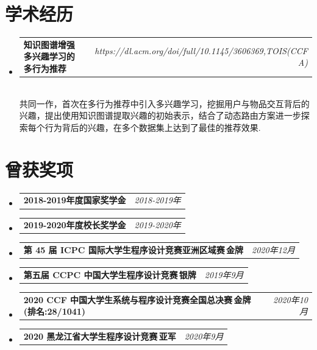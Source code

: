\documentclass[letterpaper,11pt]{article}
\makeatletter
\newcommand{\resumeItem}[2]{
  \item\small{
    \textbf{#1}{ #2 \vspace{-2pt}}
  }
}
\newcommand{\resumeSubheadingtwo}[2]{
  \vspace{-1pt}\item
    \begin{tabular*}{0.97\textwidth}{l@{\extracolsep{\fill}}r}
      \textbf{#1} & \textit{ #2} \\
    \end{tabular*}\vspace{-5pt}
}
\newcommand{\resumeSubItem}[2]{\resumeItem{#1}{#2}\vspace{-4pt}}
\makeatother
\begin{document}
\section{学术经历}
    \begin{itemize}[leftmargin=*,itemsep=-20pt]
        \resumeSubheadingtwo
            {知识图谱增强多兴趣学习的多行为推荐}{https://dl.acm.org/doi/full/10.1145/3606369,TOIS(CCF A)}
            \\[5pt]
            共同一作，首次在多行为推荐中引入多兴趣学习，挖掘用户与物品交互背后的兴趣，提出使用知识图谱提取兴趣的初始表示，结合了动态路由方案进一步探索每个行为背后的兴趣，在多个数据集上达到了最佳的推荐效果.
    \end{itemize}

\vspace{-10pt}
\section{曾获奖项}
    \begin{itemize}[leftmargin=*,itemsep=-20pt]
        \resumeSubheadingtwo
          {2018-2019年度国家奖学金}{2018-2019年}
        \resumeSubheadingtwo
          {2019-2020年度校长奖学金}{2019-2020年}
        \resumeSubheadingtwo
          {第 45 届 ICPC 国际大学生程序设计竞赛亚洲区域赛\,金牌}{2020年12月}
        \resumeSubheadingtwo
          {第五届 CCPC 中国大学生程序设计竞赛\,银牌}{2019年9月}
        \resumeSubheadingtwo
          {2020 CCF 中国大学生系统与程序设计竞赛全国总决赛\,金牌 (排名:28/1041)}{2020年10月}
        \resumeSubheadingtwo
          {2020 黑龙江省大学生程序设计竞赛\,亚军}{2020年9月}
    \end{itemize}
\end{document}
